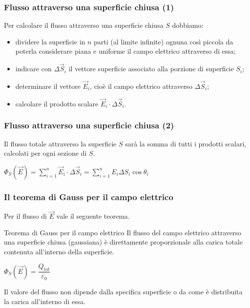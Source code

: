 \documentclass[]{beamer}
\theoremstyle{plain}
\begin{document}
\begin{frame}
  \frametitle{Flusso attraverso una superficie chiusa (1)}
  Per calcolare il flusso attraverso una superficie chiusa $ S $ dobbiamo:
  \begin{itemize}
    \item dividere la superficie in $ n $ parti (al limite infinite) ognuna così piccola da poterla considerare \alert<1>{piana} e \alert<1>{uniforme} il campo elettrico attraverso di essa;\pause
    \item indicare con $ \Delta \vec{S}_i $ il \alert<2>{vettore superficie} associato alla porzione di superficie $ S_i $;\pause
    \item determinare il vettore $ \vec{E}_i $, cioè il \alert<3>{campo elettrico attraverso $ \Delta \vec{S}_i $};\pause
    \item calcolare il \alert<4>{prodotto scalare} $ \vec{E}_i \cdot \Delta \vec{S}_i $.
  \end{itemize}
\end{frame}

\begin{frame}
  \frametitle{Flusso attraverso una superficie chiusa (2)}
  Il flusso totale attraverso la superficie $ S $ sarà la \alert<1>{somma di tutti i prodotti scalari}, calcolati per ogni sezione di $ S $.
   \begin{center}
   \colorbox{marroncino!30}{$ \Phi_S (\vec{E}) = \sum\limits_{i=1}^n \vec{E}_i \cdot \Delta \vec{S}_i =  \sum\limits_{i=1}^n E_i \Delta S_i \cos\theta_i $}
   \end{center}
\end{frame}




\begin{frame}
  \frametitle{Il teorema di Gauss per il campo elettrico}
  Per il flusso di $ \vec{E} $ vale il seguente teorema.
  \begin{block}{Teorema di Gauss per il campo elettrico}
    Il flusso del campo elettrico attraverso una superficie chiusa (gaussiana) è direttamente proporzionale alla carica totale contenuta all'interno della superficie.
    \begin{center}
   \colorbox{marroncino!30}{$ \Phi_S (\vec{E}) = \dfrac{Q_{tot}}{\varepsilon_0} $}
   \end{center}
  \end{block}\pause
  Il valore del flusso non dipende dalla specifica superficie o da come è distribuita la carica all'interno di essa.
\end{frame}
\end{document}
